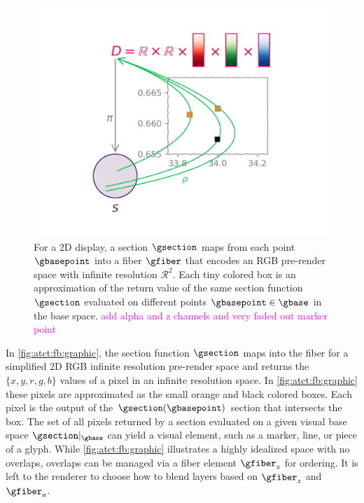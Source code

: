 \documentclass[journal]{IEEEtran}
\newcommand{\note}[1]{\textcolor{magenta}{#1}}
\theoremstyle{definition}
\theoremstyle{remark}
\begin{document}
\begin{figure}[H]
  \includegraphics[width=1\columnwidth]{fb_rho.png}
  \caption{For a 2D display, a section $\gsection$ maps from each point $\gbasepoint$ into a fiber $\gfiber$ that encodes an RGB pre-render space with infinite resolution $\mathcal{R}^{2}$. Each tiny colored box is an approximation of the return value of the same section function $\gsection$ evaluated on different points $\gbasepoint \in \gbase$ in the base space. \note{add alpha and z channels and very faded out marker point} 
  \label{fig:atct:fb:graphic}}
\end{figure}

In \autoref{fig:atct:fb:graphic}, the section function $\gsection$ maps into the fiber for a simplified 2D RGB infinite resolution pre-render space and returns the $\{x,y,r,g,b\}$ values of a pixel in an infinite resolution space. In \autoref{fig:atct:fb:graphic} these pixels are approximated as the small orange and black colored boxes. Each pixel is the output of the $\gsection(\gbasepoint)$ section that intersects the box. The set of all pixels returned by a section evaluated on a given visual base space $\gsection|_{\gbase}$ can yield a visual element, such as a marker, line, or piece of a glyph. While \autoref{fig:atct:fb:graphic} illustrates a highly idealized space with no overlaps, overlaps can be managed via a fiber element $\gfiber_{z}$ for ordering. It is left to the renderer to choose how to blend layers based on $\gfiber_{z}$ and $\gfiber_{a}$. 
\end{document}
